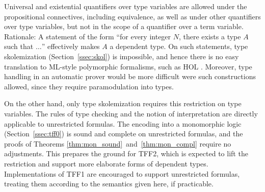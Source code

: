 
Universal and existential quantifiers over type variables are allowed under the
propositional connectives, including equivalence, as well as under other
quantifiers over type variables, but not in the scope of a quantifier over a
term variable.
Rationale: A statement of the form ``for every integer $N$, there exists a type
$A$ such that $\ldots$'' effectively makes $A$ a dependent type.
On such statements, type skolemization (Section~\ref{ssec:skol}) is impossible,
and hence there is no easy translation to ML-style polymorphic formalisms,
such as HOL \cite{gordon-melham-1993}. Moreover, type handling in an automatic
prover would be more difficult were such constructions allowed, since they
require paramodulation into types.

On the other hand, only type skolemization requires this restriction on type
variables. The rules of type checking and the notion of interpretation are
directly applicable to unrestricted formulas. The encoding into a monomorphic
logic (Section~\ref{ssec:tff0}) is sound and complete on unrestricted formulas,
and the proofs of Theorems \ref{thm:mon_sound}~and~\ref{thm:mon_compl}
require no adjustments. This prepares the ground for TFF2, which is expected to lift the
restriction and support more elaborate forms of dependent types. Implementations
of TFF1 are encouraged to support unrestricted formulas, treating them according
to the semantics given here, if practicable.

